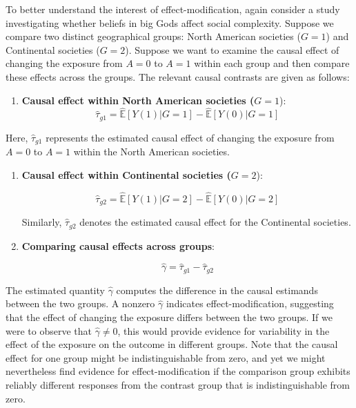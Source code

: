 \documentclass[
  single column]{article}
\providecommand{\tightlist}{%
  \setlength{\itemsep}{0pt}\setlength{\parskip}{0pt}}\usepackage{longtable,booktabs,array}
\begin{document}
To better understand the interest of effect-modification, again consider
a study investigating whether beliefs in big Gods affect social
complexity. Suppose we compare two distinct geographical groups: North
American societies (\(G=1\)) and Continental societies (\(G=2\)).
Suppose we want to examine the causal effect of changing the exposure
from \(A = 0\) to \(A = 1\) within each group and then compare these
effects across the groups. The relevant causal contrasts are given as
follows:

\begin{enumerate}
\def\labelenumi{\arabic{enumi}.}
\tightlist
\item
  \textbf{Causal effect within North American societies (}\(G=1\)):
  \[\hat{\tau}_{g1} = \hat{\mathbb{E}}[Y(1)|G=1] - \hat{\mathbb{E}}[Y(0)|G=1]\]
\end{enumerate}

Here, \(\hat{\tau}_{g1}\) represents the estimated causal effect of
changing the exposure from \(A = 0\) to \(A = 1\) within the North
American societies.

\begin{enumerate}
\def\labelenumi{\arabic{enumi}.}
\setcounter{enumi}{1}
\item
  \textbf{Causal effect within Continental societies (}\(G=2\)):

  \[\hat{\tau}_{g2} = \hat{\mathbb{E}}[Y(1)|G=2] - \hat{\mathbb{E}}[Y(0)|G=2]\]

  Similarly, \(\hat{\tau}_{g2}\) denotes the estimated causal effect for
  the Continental societies.
\item
  \textbf{Comparing causal effects across groups}:

  \[\hat{\gamma} = \hat{\tau}_{g1} - \hat{\tau}_{g2}\]
\end{enumerate}

The estimated quantity \(\hat{\gamma}\) computes the difference in the
causal estimands between the two groups. A nonzero \(\hat{\gamma}\)
indicates effect-modification, suggesting that the effect of changing
the exposure differs between the two groups. If we were to observe that
\(\hat{\gamma} \neq 0\), this would provide evidence for variability in
the effect of the exposure on the outcome in different groups. Note that
the causal effect for one group might be indistinguishable from zero,
and yet we might nevertheless find evidence for effect-modification if
the comparison group exhibits reliably different responses from the
contrast group that is indistinguishable from zero.
\end{document}

